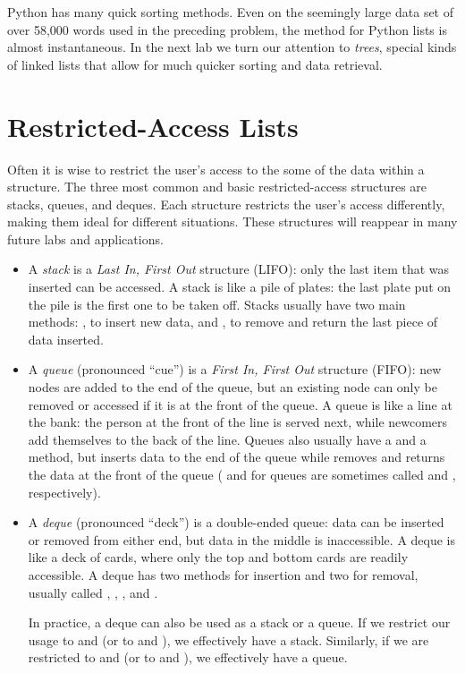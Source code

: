 \begin{info} %
Python has many quick sorting methods.
Even on the seemingly large data set of over 58,000 words used in the preceding problem, the  method for Python lists is almost instantaneous.
In the next lab we turn our attention to \emph{trees}, special kinds of linked lists that allow for much quicker sorting and data retrieval.
\end{info}

\section*{Restricted-Access Lists}
Often it is wise to restrict the user's access to the some of the data within a structure.
The three most common and basic restricted-access structures are stacks, queues, and deques.
Each structure restricts the user's access differently, making them ideal for different situations.
These structures will reappear in many future labs and applications.

\begin{itemize}
\item A \emph{stack} is a \emph{Last In, First Out} structure (LIFO): only the last item that was inserted can be accessed.
A stack is like a pile of plates: the last plate put on the pile is the first one to be taken off.
Stacks usually have two main methods: , to insert new data, and , to remove and return the last piece of data inserted.

\item A \emph{queue} (pronounced ``cue'') is a \emph{First In, First Out} structure (FIFO): new nodes are added to the end of the queue, but an existing node can only be removed or accessed if it is at the front of the queue.
A queue is like a line at the bank: the person at the front of the line is served next, while newcomers add themselves to the back of the line.
Queues also usually have a  and a  method, but  inserts data to the end of the queue while  removes and returns the data at the front of the queue ( and  for queues are sometimes called  and , respectively).

\item A \emph{deque} (pronounced ``deck'') is a double-ended queue: data can be inserted or removed from either end, but data in the middle is inaccessible.
A deque is like a deck of cards, where only the top and bottom cards are readily accessible.
A deque has two methods for insertion and two for removal, usually called , , , and .

In practice, a deque can also be used as a stack or a queue.
If we restrict our usage to  and  (or to  and ), we effectively have a stack.
Similarly, if we are restricted to  and  (or to  and ), we effectively have a queue.
\end{itemize}

